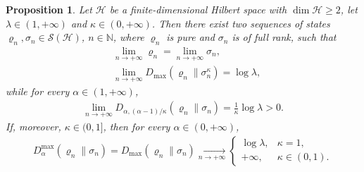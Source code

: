 \documentclass[unsortedaddress,superscriptaddress,pra,notitlepage]{revtex4}
\newtheorem{prop}[definition]{Proposition}
\def\S{{\mathcal S}}
\def\bN{\mathbb{N}}
\def\rho{\varrho}
\def\hil{{\mathcal H}}
\def\pwr{\kappa}
\DeclareMathOperator{\divv}{\Delta}
\begin{document}
\begin{prop}\label{prop:a>1 discont}
Let $\hil$ be a finite-dimensional Hilbert space with $\dim\hil\ge 2$, 
let $\lambda\in(1,+\infty)$ and $\pwr\in(0,+\infty)$.
Then there exist two sequences of states 
$\rho_n,\sigma_n\in\S(\hil)$, $n\in\bN$, 
where $\rho_n$ is pure and $\sigma_n$ is of full rank, 
such that 
\begin{align}
&\lim_{n\to+\infty}\rho_n=\lim_{n\to+\infty}\sigma_n,\label{divv discont2}\\
&\lim_{n\to+\infty}D_{\max}(\rho_n\|\sigma_n^{\pwr})
=\log\lambda,
\label{divv discont3}
\end{align}
while for every $\alpha\in(1,+\infty)$,
\begin{align}\label{divv discont4}
\lim_{n\to+\infty}D_{\alpha,(\alpha-1)/\pwr}(\rho_n\|\sigma_n)=\frac{1}{\pwr}\log\lambda>0.
\end{align}
If, moreover, $\pwr\in(0,1]$, then for every $\alpha\in(0,+\infty)$, 
\begin{align}\label{divv discont5}
D_{\alpha}^{\max}(\rho_n\|\sigma_n)=D_{\max}(\rho_n\|\sigma_n)\xrightarrow[n\to+\infty]{}
\begin{cases}
\log\lambda,&\pwr=1,\\
+\infty,&\pwr\in(0,1).
\end{cases}
\end{align}
\end{prop}
\end{document}
